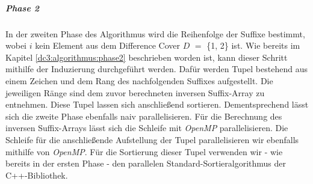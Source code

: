 \subparagraph*{Phase 2}
In der zweiten Phase des Algorithmus wird die Reihenfolge der Suffixe  bestimmt, wobei $i$ kein Element aus dem Difference Cover \(D\) $=$ \{1, 2\} ist. Wie bereits im Kapitel \ref{dc3:algorithmus:phase2} beschrieben worden ist, kann dieser Schritt mithilfe der Induzierung durchgeführt werden. Dafür werden Tupel bestehend aus einem Zeichen  und dem Rang des nachfolgenden Suffixes  aufgestellt. Die jeweiligen Ränge sind dem zuvor berechneten inversen Suffix-Array zu entnehmen. Diese Tupel lassen sich anschließend sortieren.
Dementsprechend lässt sich die zweite Phase ebenfalls naiv parallelisieren. Für die Berechnung des inversen Suffix-Arrays lässt sich die Schleife mit \emph{OpenMP} parallelisieren. Die Schleife für die anschließende Aufstellung der Tupel parallelisieren wir ebenfalls mithilfe von \emph{OpenMP}. Für die Sortierung dieser Tupel verwenden wir - wie bereits in der ersten Phase - den parallelen Standard-Sortieralgorithmus der C++-Bibliothek.